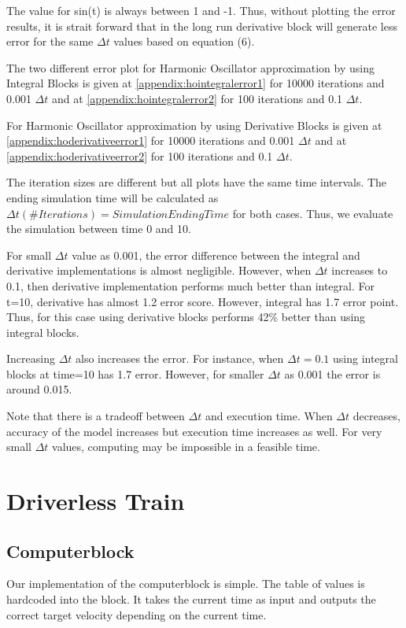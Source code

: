 \documentclass{article}
\begin{document}
The value for sin(t) is always between 1 and -1. Thus, without plotting the error results, it is strait forward that in the long run derivative block will generate less error for the same $\Delta t$ values based on equation (6).   

The two different error plot for Harmonic Oscillator approximation by using Integral Blocks is given at \ref{appendix:hointegralerror1} for 10000 iterations and 0.001 ${\Delta t}$ and at \ref{appendix:hointegralerror2} for 100 iterations and 0.1 ${\Delta t}$. 

For Harmonic Oscillator approximation by using Derivative Blocks is given at \ref{appendix:hoderivativeerror1} for 10000 iterations and 0.001 ${\Delta t}$ and at \ref{appendix:hoderivativeerror2} for 100 iterations and 0.1 ${\Delta t}$. 

The iteration sizes are different but all plots have the same time intervals. The ending simulation time will be calculated as ${\Delta t}(\#Iterations) = Simulation Ending Time$ for both cases. Thus, we evaluate the simulation between time 0 and 10.

For small ${\Delta t}$ value as 0.001, the error difference between the integral and derivative implementations is almost negligible. However, when ${\Delta t}$ increases to 0.1, then derivative implementation performs much better than integral. For t=10, derivative has almost 1.2 error score. However, integral has 1.7 error point. Thus, for this case using derivative blocks performs 42\% better than using integral blocks.

Increasing  ${\Delta t}$ also increases the error. For instance, when ${\Delta t} = 0.1$ using integral blocks at time=10 has 1.7 error. However, for smaller ${\Delta t}$ as 0.001 the error is around 0.015.

Note that there is a tradeoff between ${\Delta t}$ and execution time. When ${\Delta t}$ decreases, accuracy of the model increases but execution time increases as well. For very small ${\Delta t}$ values, computing may be impossible in a feasible time. 
\pagebreak
\section{Driverless Train}
\subsection{Computerblock}
Our implementation of the computerblock is simple. The table of values is hardcoded into the block. It takes the current time as input and outputs the correct target velocity depending on the current time. 
\end{document}
